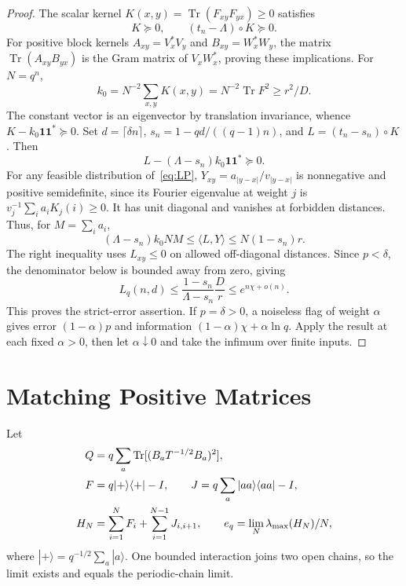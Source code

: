 \documentclass[12pt,letterpaper,onecolumn]{article}
\DeclareMathOperator{\Tr}{Tr}
\newcommand{\one}{\mathbf 1}
\begin{document}
\begin{proof}
The scalar kernel $K(x,y)=\Tr(F_{xy}F_{yx})\ge0$ satisfies
\[
K\succeq0,\qquad(t_n-\Lambda)\circ K\succeq0.
\]
For positive block kernels $A_{xy}=V_x^*V_y$ and $B_{xy}=W_x^*W_y$, the matrix $\Tr(A_{xy}B_{yx})$ is the Gram matrix of $V_xW_x^*$, proving these implications. For $N=q^n$,
\[
k_0=N^{-2}\sum_{x,y}K(x,y)=N^{-2}\Tr F^2\ge r^2/D.
\]
The constant vector is an eigenvector by translation invariance, whence $K-k_0\one\one^*\succeq0$. Set $d=\lceil\delta n\rceil$, $s_n=1-qd/((q-1)n)$, and $L=(t_n-s_n)\circ K$. Then
\[
L-(\Lambda-s_n)k_0\one\one^*\succeq0.
\]
For any feasible distribution of~\eqref{eq:LP}, $Y_{xy}=a_{|y-x|}/v_{|y-x|}$ is nonnegative and positive semidefinite, since its Fourier eigenvalue at weight $j$ is $v_j^{-1}\sum_i a_iK_j(i)\ge0$. It has unit diagonal and vanishes at forbidden distances. Thus, for $M=\sum_i a_i$,
\[
(\Lambda-s_n)k_0NM\le\langle L,Y\rangle\le N(1-s_n)r.
\]
The right inequality uses $L_{xy}\le0$ on allowed off-diagonal distances. Since $p<\delta$, the denominator below is bounded away from zero, giving
\begin{equation}\label{eq:finitebound}
L_q(n,d)\le\frac{1-s_n}{\Lambda-s_n}\frac Dr
\le e^{n\chi+o(n)}.
\end{equation}
This proves the strict-error assertion. If $p=\delta>0$, a noiseless flag of weight $\alpha$ gives error $(1-\alpha)p$ and information $(1-\alpha)\chi+\alpha\ln q$. Apply the result at each fixed $\alpha>0$, then let $\alpha\downarrow0$ and take the infimum over finite inputs.
\end{proof}

\section{Matching Positive Matrices}
Let
\begin{align}
Q&=q\sum_a\Tr[(B_aT^{-1/2}B_a)^2],\notag\\
F&=q|+\rangle\langle+|-I,\qquad
J=q\sum_a|aa\rangle\langle aa|-I,\label{eq:operators}\\
H_N&=\sum_{i=1}^NF_i+\sum_{i=1}^{N-1}J_{i,i+1},\qquad
e_q=\lim_N\lambda_{\max}(H_N)/N,\notag
\end{align}
where $|+\rangle=q^{-1/2}\sum_a|a\rangle$. One bounded interaction joins two open chains, so the limit exists and equals the periodic-chain limit.
\end{document}
